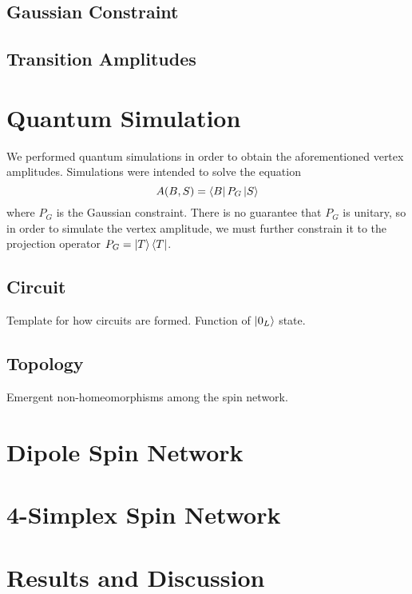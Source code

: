 \documentclass[a4paper,11pt,aps,tightenlines,nofootinbib]{revtex4}
\begin{document}
\subsection{Gaussian Constraint}

\subsection{Transition Amplitudes}



\section{Quantum Simulation}
We performed quantum simulations in order to obtain the aforementioned vertex amplitudes. Simulations 
were intended to solve the equation 
\begin{equation}
        A(B,S) = \bra{B}P_G\ket{S}
\end{equation}
where $P_G$ is the Gaussian constraint. There is no guarantee that $P_G$ is unitary, so in order 
to simulate the vertex amplitude, we must further constrain it to the projection operator $P_G = \ket{T}\bra{T}$.

\subsection{Circuit}
Template for how circuits are formed. Function of $\ket{0_L}$ state.
\subsection{Topology}
Emergent non-homeomorphisms among the spin network.

\section{Dipole Spin Network}

\section{4-Simplex Spin Network}

\section{Results and Discussion}
\end{document}
